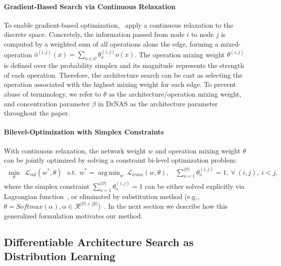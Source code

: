 \documentclass{article} \usepackage{iclr2021_conference,times}
\DeclareMathOperator*{\argmin}{arg\,min}
\begin{document}
\paragraph{Gradient-Based Search via Continuous Relaxation}
To enable gradient-based optimization,~\citet{darts}
apply a continuous relaxation to the discrete space.
Concretely, the information passed from node $i$ to node $j$ is computed by a weighted sum of all operations alone the edge, forming a mixed-operation $\hat{o}^{(i,j)}(x) = \sum_{o\in\mathcal{O}} \theta_o^{(i,j)} o(x)$.
The operation mixing weight $\theta^{(i,j)}$ is defined over the probability simplex and its magnitude represents the strength of each operation.
Therefore, the architecture search can be cast as selecting the operation associated with the highest mixing weight for each edge.
To prevent abuse of terminology, we refer to $\theta$ as the architecture/operation mixing weight, and concentration parameter $\beta$ in DrNAS as the architecture parameter throughout the paper.

\paragraph{Bilevel-Optimization with Simplex Constraints}
With continuous relaxation, the network weight $w$ and operation mixing weight $\theta$ can be jointly optimized by solving a constraint bi-level optimization problem:
\begin{align}
	\label{eq:bi}
    \min_{\theta}\  \ \mathcal{L}_{val} (w^*, \theta)  \ \ 
    \text{ s.t.}\  \ w^* = \argmin_w\ \mathcal{L}_{train}(w,\theta), \ \ \ \ 
\sum_{o=1}^{|\mathcal{O}|}\theta_o^{(i,j)}=1,\ \forall\ (i,j),\ i<j, 
\end{align}
where the simplex constraint $\sum_{o=1}^{|\mathcal{O}|} {\theta_o^{(i,j)} = 1}$ can be either solved explicitly via Lagrangian function~\citep{gaea}, or eliminated by substitution method (e.g., $\theta = Softmax(\alpha), \alpha\in \mathcal{R}^{|\mathcal{O}| \times |E|}$)~\citep{darts}.
In the next section we describe how this generalized formulation motivates our method.

\subsection{Differentiable Architecture Search as Distribution Learning}
\label{subsec:drnas}
\end{document}
